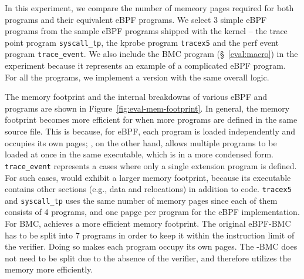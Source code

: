 In this experiment, we compare the number of memeory pages required for both
    \projname{} programs and their equivalent eBPF programs.
We select 3 simple eBPF programs from the sample eBPF programs shipped with the
    kernel -- the trace point program \texttt{syscall\_tp}, the kprobe program
    \texttt{tracex5} and the perf event program \texttt{trace\_event}.
We also include the BMC program (\S~\ref{eval:macro}) in the experiment because
    it represents an example of a complicated eBPF program.
For all the programs, we implement a \projname{} version with the same
    overall logic.

The memory footprint and the internal breakdowns of various eBPF and
    \projname{} programs are shown in Figure~\ref{fig:eval-mem-footprint}.
In general, the memory footprint becomes more efficient for \projname{} when
    more programs are defined in the same source file. 
This is because, for eBPF, each program is loaded independently and occupies its
    own pages; \projname{}, on the other hand, allows multiple programs to be
    loaded at once in the same executable, which is in a more condensed form.
\texttt{trace\_event} represents a cases where only a single extension program
    is defined.
For such cases, \projname{} would exhibit a larger memory footprint, because
    its executable contains other sections (e.g., data and relocations) in
    addition to code.
\texttt{tracex5} and \texttt{syscall\_tp} uses the same number of memory pages
    since each of them consists of 4 programs, and one papge per program for
    the eBPF implementation.
For BMC, \projname{} achieves a more efficient memory footprint.
The original eBPF-BMC has to be split into 7 programs in order to keep it
    within the instruction limit of the verifier.
Doing so makes each program occupy its own pages.
The \projname{}-BMC does not need to be split due to the absence of the
    verifier, and therefore utilizes the memory more efficiently.



